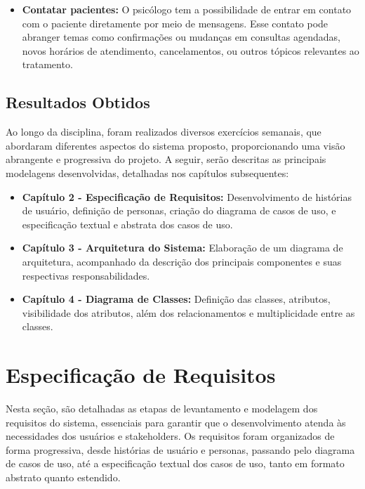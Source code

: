 \documentclass[a4paper,12pt]{report}
\begin{document}
\begin{itemize}
    \item \textbf{Contatar pacientes:} O psicólogo tem a possibilidade de entrar em contato com o paciente diretamente por meio de mensagens. Esse contato pode abranger temas como confirmações ou mudanças em consultas agendadas, novos horários de atendimento, cancelamentos, ou outros tópicos relevantes ao tratamento. 
    

\end{itemize}


\section{Resultados Obtidos} Ao longo da disciplina, foram realizados diversos exercícios semanais, que abordaram diferentes aspectos do sistema proposto, proporcionando uma visão abrangente e progressiva do projeto. A seguir, serão descritas as principais modelagens desenvolvidas, detalhadas nos capítulos subsequentes:

\begin{itemize} 
\item \textbf{Capítulo 2 - Especificação de Requisitos:} Desenvolvimento de histórias de usuário, definição de personas, criação do diagrama de casos de uso, e especificação textual e abstrata dos casos de uso. 
\item \textbf{Capítulo 3 - Arquitetura do Sistema:} Elaboração de um diagrama de arquitetura, acompanhado da descrição dos principais componentes e suas respectivas responsabilidades. 
\item \textbf{Capítulo 4 - Diagrama de Classes:} Definição das classes, atributos, visibilidade dos atributos, além dos relacionamentos e multiplicidade entre as classes. 
\end{itemize}

\chapter{Especificação de Requisitos}

Nesta seção, são detalhadas as etapas de levantamento e modelagem dos requisitos do sistema, essenciais para garantir que o desenvolvimento atenda às necessidades dos usuários e stakeholders. Os requisitos foram organizados de forma progressiva, desde histórias de usuário e personas, passando pelo diagrama de casos de uso, até a especificação textual dos casos de uso, tanto em formato abstrato quanto estendido. 
\\
\end{document}
